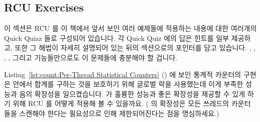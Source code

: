 
\subsection{RCU Exercises}
\label{sec:defer:RCU Exercises}

이 섹션은 RCU 를 이 책에서 앞서 보인 여러 예제들에 적용하는 내용에 대한
여러개의 Quick Quizz 들로 구성되어 있습니다.
각 Quick Quiz 에의 답은 힌트를 일부 제공하고, 또한 그 해법이 자세히 설명되어
있는 뒤의 섹션으로의 포인터를 담고 있습니다.
, , ,
, 그리고  기능들만으로도 이
문제들에 충분해야 할 겁니다.
\iffalse

This section is organized as a series of Quick Quizzes that invite you
to apply RCU to a number of examples earlier in this book.
The answer to each Quick Quiz gives some hints, and also contains a
pointer to a later section where the solution is explained at length.
The \co{rcu_read_lock()}, \co{rcu_read_unlock()}, \co{rcu_dereference()},
\co{rcu_assign_pointer()}, and \co{synchronize_rcu()} primitives should
suffice for most of these exercises.
\fi

\QuickQuiz{}
	Listing~\ref{lst:count:Per-Thread Statistical Counters}
	()
	에 보인 통계적 카운터의 구현은  안에서 합계를 구하는
	것을 보호하기 위해 글로벌 락을 사용했는데 이게 부족한 성능과 음의
	확장성을 일으켰습니다.
	 가 훌륭한 성능과 좋은 확장성을 제공할 수 있게 하기
	위해 RCU 를 어떻게 적용해 볼 수 있을까요.
	( 의 확장성은 모든 쓰레드의 카운터들을 스캔해야 한다는
	필요성으로 인해 제한되어진다는 점을 명심하세요.)
	\iffalse

